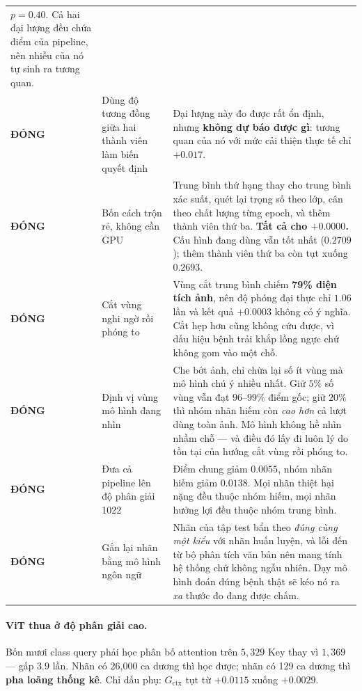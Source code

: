\documentclass[11pt,a4paper]{article}
\newcommand{\DONG}{\textbf{\textcolor{red!62!black}{ĐÓNG}}}
\begin{document}
\begin{longtable}{@{}l p{4.5cm} p{9.2cm}@{}}
$p = 0.40$. Cả hai đại lượng đều chứa điểm của pipeline, nên nhiễu của nó tự sinh ra
tương quan. \\
\addlinespace
\DONG &Dùng độ tương đồng giữa hai thành viên làm biến quyết định &
Đại lượng này đo được rất ổn định, nhưng \textbf{không dự báo được gì}: tương quan của
nó với mức cải thiện thực tế chỉ $+0.017$. \\
\addlinespace
\DONG &Bốn cách trộn rẻ, không cần GPU &
Trung bình thứ hạng thay cho trung bình xác suất, quét lại trọng số theo lớp, cân theo
chất lượng từng epoch, và thêm thành viên thứ ba. \textbf{Tất cả cho $+0.0000$.} Cấu
hình đang dùng vẫn tốt nhất ($0.2709$); thêm thành viên thứ ba còn tụt xuống $0.2693$. \\
\addlinespace
\DONG &Cắt vùng nghi ngờ rồi phóng to &
Vùng cắt trung bình chiếm \textbf{79\% diện tích ảnh}, nên độ phóng đại thực chỉ
$1.06$ lần và kết quả $+0.0003$ không có ý nghĩa. Cắt hẹp hơn cũng không cứu được, vì
dấu hiệu bệnh trải khắp lồng ngực chứ không gom vào một chỗ. \\
\addlinespace
\DONG &Định vị vùng mô hình đang nhìn &
Che bớt ảnh, chỉ chừa lại số ít vùng mà mô hình chú ý nhiều nhất. Giữ $5\%$ số vùng vẫn
đạt $96$--$99\%$ điểm gốc; giữ $20\%$ thì nhóm nhãn hiếm còn \emph{cao hơn} cả lượt dùng
toàn ảnh. Mô hình không hề nhìn nhầm chỗ --- và điều đó lấy đi luôn lý do tồn tại của
hướng cắt vùng rồi phóng to. \\
\addlinespace
\DONG &Đưa cả pipeline lên độ phân giải 1022 &
Điểm chung giảm $0.0055$, nhóm nhãn hiếm giảm $0.0138$. Mọi nhãn thiệt hại nặng đều
thuộc nhóm hiếm, mọi nhãn hưởng lợi đều thuộc nhóm trung bình. \\
\addlinespace
\DONG &Gắn lại nhãn bằng mô hình ngôn ngữ &
Nhãn của tập test bẩn theo \emph{đúng cùng một kiểu} với nhãn huấn luyện, và lỗi đến từ
bộ phân tích văn bản nên mang tính hệ thống chứ không ngẫu nhiên. Dạy mô hình đoán đúng
bệnh thật sẽ kéo nó ra \emph{xa} thước đo đang được chấm. \\
\bottomrule
\end{longtable}


\paragraph{ViT thua ở độ phân giải cao.} Bốn mươi class query phải học phân bố
attention trên $5{,}329$ Key thay vì $1{,}369$ --- gấp $3.9$ lần. Nhãn có 26{,}000 ca
dương thì học được; nhãn có 129 ca dương thì \textbf{pha loãng thống kê}. Chỉ dấu phụ:
$G_{\text{ctx}}$ tụt từ $+0.0115$ xuống $+0.0029$.
\end{document}
